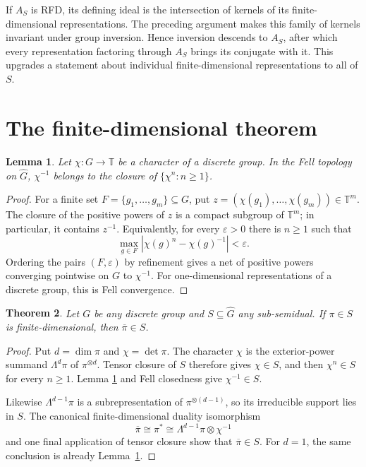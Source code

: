 \documentclass[11pt,a4paper]{article}
\newtheorem{theorem}{Theorem}
\newtheorem{lemma}[theorem]{Lemma}
\newcommand{\T}{\mathbb T}
\newcommand{\widehatG}{\widehat G}
\begin{document}
If $A_S$ is RFD, its defining ideal is the intersection of kernels of its
finite-dimensional representations.  The preceding argument makes this family
of kernels invariant under group inversion.  Hence inversion descends to
$A_S$, after which every representation factoring through $A_S$ brings its
conjugate with it.  This upgrades a statement about individual finite-dimensional
representations to all of $S$.

\section{The finite-dimensional theorem}

\begin{lemma}\label{lem:recurrence}
Let $\chi:G\to\T$ be a character of a discrete group.  In the Fell topology on
$\widehatG$, $\chi^{-1}$ belongs to the closure of
$\{\chi^n:n\geq1\}$.
\end{lemma}

\begin{proof}
For a finite set $F=\{g_1,\ldots,g_m\}\subseteq G$, put
$z=(\chi(g_1),\ldots,\chi(g_m))\in\T^m$.  The closure of the positive powers of
$z$ is a compact subgroup of $\T^m$; in particular, it contains $z^{-1}$.
Equivalently, for every $\varepsilon>0$ there is $n\geq1$ such that
\[
 \max_{g\in F}|\chi(g)^n-\chi(g)^{-1}|<\varepsilon.
\]
Ordering the pairs $(F,\varepsilon)$ by refinement gives a net of positive
powers converging pointwise on $G$ to $\chi^{-1}$.  For one-dimensional
representations of a discrete group, this is Fell convergence.
\end{proof}

\begin{theorem}\label{thm:finite}
Let $G$ be any discrete group and $S\subseteq\widehatG$ any sub-semidual.  If
$\pi\in S$ is finite-dimensional, then $\overline\pi\in S$.
\end{theorem}

\begin{proof}
Put $d=\dim\pi$ and $\chi=\det\pi$.  The character $\chi$ is the exterior-power
summand $\Lambda^d\pi$ of $\pi^{\otimes d}$.  Tensor closure of $S$ therefore
gives $\chi\in S$, and then $\chi^n\in S$ for every $n\geq1$.  Lemma
\ref{lem:recurrence} and Fell closedness give $\chi^{-1}\in S$.

Likewise $\Lambda^{d-1}\pi$ is a subrepresentation of
$\pi^{\otimes(d-1)}$, so its irreducible support lies in $S$.  The canonical
finite-dimensional duality isomorphism
\[
 \overline\pi\cong\pi^*
 \cong \Lambda^{d-1}\pi\otimes\chi^{-1}
\]
and one final application of tensor closure show that $\overline\pi\in S$.
For $d=1$, the same conclusion is already Lemma~\ref{lem:recurrence}.
\end{proof}
\end{document}
